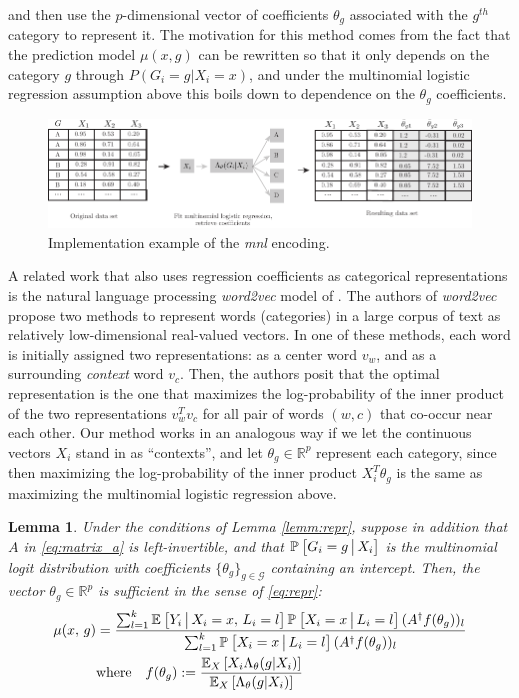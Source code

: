 \documentclass{article}
\theoremstyle{plain}
\newtheorem{lemm}[prop]{Lemma}
\theoremstyle{definition}
\theoremstyle{remark}
\begin{document}
\noindent and then use the $p$-dimensional vector of coefficients $\theta_{g}$ associated with the $g^{th}$ category to represent it. The motivation for this method comes from the fact that the prediction model $\mu(x, g)$ can be rewritten so that it only depends on the category $g$ through $P(G_{i}=g|X_{i}=x)$, and under the  multinomial logistic regression assumption above this boils down to dependence on the $\theta_{g}$ coefficients.

\begin{figure}[H]
  \centering
  \includegraphics[width=\textwidth]{figures/mnl.pdf}
  \caption{Implementation example of the \emph{mnl} encoding.}
  \label{fig:mnl_encoding}
\end{figure}


A related work that also uses regression coefficients as categorical representations is the natural language processing \emph{word2vec} model of \cite{mikolov2013efficient}. The authors of \emph{word2vec} propose two methods to represent words (categories) in a large corpus of text as relatively low-dimensional real-valued vectors. In one of these methods, each word is initially assigned two representations: as a center word $v_{w}$, and as a surrounding \emph{context} word $v_{c}$. Then, the authors posit that the optimal representation is the one that maximizes the log-probability of the inner product of the two representations $v_{w}^{T}v_{c}$ for all pair of words $(w, c)$ that co-occur near each other. Our method works in an analogous way if we let the continuous vectors $X_{i}$ stand in as ``contexts'', and let $\theta_{g} \in \mathbb{R}^{p}$ represent each category, since then maximizing the log-probability of the inner product $X_{i}^{T}\theta_{g}$ is the same as maximizing the multinomial logistic regression above.


\begin{lemm}
\label{lemm:mnl}
Under the conditions of Lemma \ref{lemm:repr}, suppose in addition that $A$ in \eqref{eq:matrix_a} is left-invertible, and that $\PP{ G_{i}=g \cond X_{i}}$ is the multinomial logit distribution with coefficients $\{\theta_{g} \}_{g \in \mathcal{G}}$ containing an intercept. Then, the vector $\theta_{g} \in \mathbb{R}^{p}$ is sufficient in the sense of \eqref{eq:repr}:
\begin{align}
\mu(x, \, g) &= \frac{\sum_{l = 1}^k  \EE{Y_i \cond X_i = x, \, L_i = l} \PP{X_i = x \cond L_i = l} (A^\dagger f(\theta_g))_l}
                     {\sum_{l = 1}^k \PP{X_i = x \cond L_i = l} (A^\dagger f(\theta_{g}))_{l} } \\
&\text{where} \quad f(\theta_{g}) := \frac{\EE[X]{ X_{i}\Lambda_{\theta}(g|X_{i})}}{\EE[X]{\Lambda_{\theta}(g|X_{i})}}
\end{align}
\end{lemm}
\end{document}
